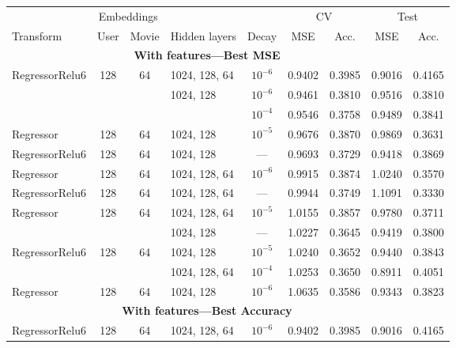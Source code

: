 \begin{table}
\centering
\small
\begin{tabular}{lcclccccc}
\toprule
           & \multicolumn{2}{c}{Embeddings} &  &   &  \multicolumn{2}{c}{CV} & \multicolumn{2}{c}{Test} \\
           \cmidrule(lr){2-3}\cmidrule(lr){6-7}\cmidrule(l){8-9}
Transform & User & Movie & Hidden layers &  Decay & MSE & Acc. & MSE & Acc.  \\
\midrule
\multicolumn{8}{c}{\textbf{With features---Best MSE}}\\\addlinespace
RegressorRelu6 & 128 & 64 & 1024, 128, 64 & $10^{-6}$   &  0.9402 &      0.3985 &   0.9016 &        0.4165 \\
           &     &    & 1024, 128 & $10^{-6}$   &  0.9461 &      0.3810 &   0.9516 &        0.3810 \\
           &     &    &                                 & $10^{-4}$   &  0.9546 &      0.3758 &   0.9489 &        0.3841 \\
Regressor & 128 & 64 & 1024, 128 & $10^{-5}$   &  0.9676 &      0.3870 &   0.9869 &        0.3631 \\
RegressorRelu6 & 128 & 64 & 1024, 128 & ---   &  0.9693 &      0.3729 &   0.9418 &        0.3869 \\
Regressor & 128 & 64 & 1024, 128, 64 & $10^{-6}$   &  0.9915 &      0.3874 &   1.0240 &        0.3570 \\
RegressorRelu6 & 128 & 64 & 1024, 128, 64 & ---   &  0.9944 &      0.3749 &   1.1091 &        0.3330 \\
Regressor & 128 & 64 & 1024, 128, 64 & $10^{-5}$   &  1.0155 &      0.3857 &   0.9780 &        0.3711 \\
           &     &    & 1024, 128 & ---   &  1.0227 &      0.3645 &   0.9419 &        0.3800 \\
RegressorRelu6 & 128 & 64 & 1024, 128 & $10^{-5}$   &  1.0240 &      0.3652 &   0.9440 &        0.3843 \\
           &     &    & 1024, 128, 64 & $10^{-4}$   &  1.0253 &      0.3650 &   0.8911 &        0.4051 \\
Regressor & 128 & 64 & 1024, 128 & $10^{-6}$   &  1.0635 &      0.3586 &   0.9343 &        0.3823 \\
\midrule
\multicolumn{8}{c}{\textbf{With features---Best Accuracy}}\\\addlinespace
RegressorRelu6 & 128 & 64 & 1024, 128, 64 & $10^{-6}$   &  0.9402 &      0.3985 &   0.9016 &        0.4165 \\

\end{tabular}
\end{table}
